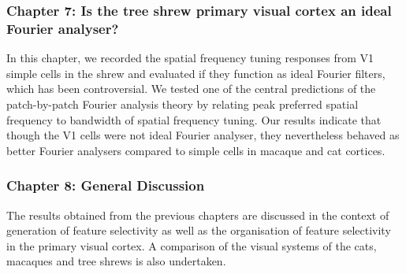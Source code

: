 \subsubsection{Chapter 7: Is the tree shrew primary visual cortex an ideal Fourier analyser?}

In this chapter, we recorded the spatial frequency tuning responses from
V1 simple cells in the shrew and evaluated if they function as ideal
Fourier filters, which has been controversial. We tested one of the
central predictions of the patch-by-patch Fourier analysis theory \cite{Robson1975}by
relating peak preferred spatial frequency to bandwidth of spatial
frequency tuning. Our results indicate that though the V1 cells were not
ideal Fourier analyser, they nevertheless behaved as better Fourier
analysers compared to simple cells in macaque and cat cortices.

\subsubsection{Chapter 8: General Discussion}

The results obtained from the previous chapters are discussed in the
context of generation of feature selectivity as well as the organisation
of feature selectivity in the primary visual cortex. A comparison of the
visual systems of the cats, macaques and tree shrews is also undertaken.

\pagebreak
\pagebreak